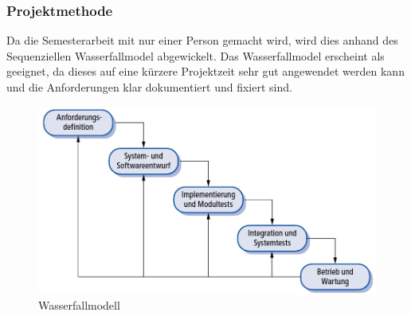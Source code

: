 \subsubsection{Projektmethode}
Da die Semesterarbeit mit nur einer Person gemacht wird, wird dies anhand des Sequenziellen Wasserfallmodel abgewickelt. Das Wasserfallmodel erscheint als geeignet, da dieses auf eine kürzere Projektzeit sehr gut angewendet werden kann und die Anforderungen klar dokumentiert und fixiert sind.

\begin{figure}[htp]
    \begin{center}
        \includegraphics[width=0.5\linewidth]{content/images/wasserfallmodell.png}
        \caption{Wasserfallmodell}
        \label{fig:wasserfallmodell}
      \end{center}
\end{figure}

\newpage

